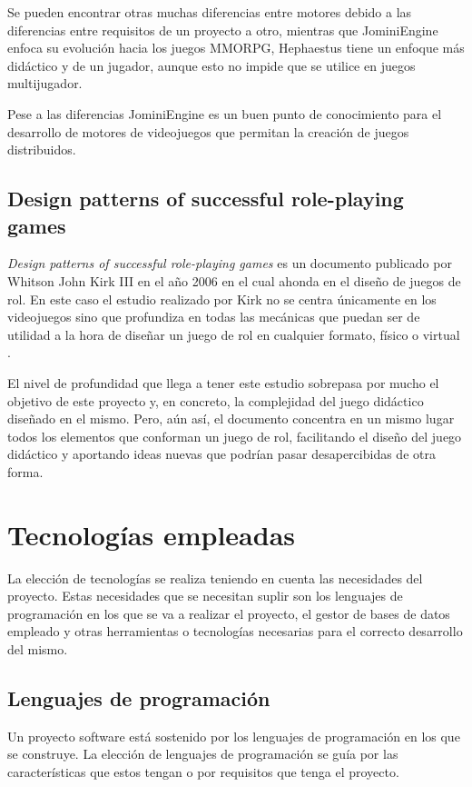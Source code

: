 Se pueden encontrar otras muchas diferencias entre motores debido a las diferencias entre requisitos de un proyecto a otro, mientras que JominiEngine enfoca su evolución hacia los juegos MMORPG, Hephaestus tiene un enfoque más didáctico y de un jugador, aunque esto no impide que se utilice en juegos multijugador.

Pese a las diferencias JominiEngine es un buen punto de conocimiento para el desarrollo de motores de videojuegos que permitan la creación de juegos distribuidos.

\subsection{Design patterns of successful role-playing games}

\textit{Design patterns of successful role-playing games} es un documento publicado por Whitson John Kirk III en el año 2006 en el cual ahonda en el diseño de juegos de rol. En este caso el estudio realizado por Kirk no se centra únicamente en los videojuegos sino que profundiza en todas las mecánicas que puedan ser de utilidad a la hora de diseñar un juego de rol en cualquier formato, físico o virtual \cite{kirk2006design}.

El nivel de profundidad que llega a tener este estudio sobrepasa por mucho el objetivo de este proyecto y, en concreto, la complejidad del juego didáctico diseñado en el mismo. Pero, aún así, el documento concentra en un mismo lugar todos los elementos que conforman un juego de rol, facilitando el diseño del juego didáctico y aportando ideas nuevas que podrían pasar desapercibidas de otra forma.

\section{Tecnologías empleadas} \label{tecnologias}

La elección de tecnologías se realiza teniendo en cuenta las necesidades del proyecto. Estas necesidades que se necesitan suplir son los lenguajes de programación en los que se va a realizar el proyecto, el gestor de bases de datos empleado y otras herramientas o tecnologías necesarias para el correcto desarrollo del mismo.

\subsection{Lenguajes de programación}

Un proyecto software está sostenido por los lenguajes de programación en los que se construye. La elección de lenguajes de programación se guía por las características que estos tengan o por requisitos que tenga el proyecto.

